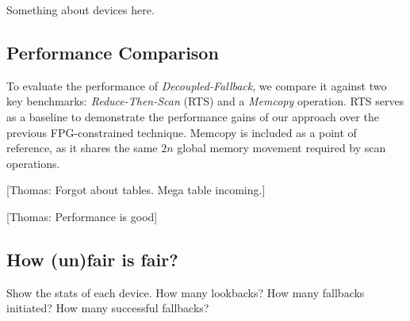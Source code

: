 \documentclass[sigconf]{acmart}
\newcommand{\thomas}[1]{{\footnotesize\color{orange}[Thomas: #1]}}
\begin{document}
Something about devices here.
\subsection{Performance Comparison}
To evaluate the performance of \emph{Decoupled-Fallback}, we compare it against two key benchmarks: \emph{Reduce-Then-Scan} (RTS) and a \emph{Memcopy} operation. RTS serves as a baseline to demonstrate the performance gains of our approach over the previous FPG-constrained technique. Memcopy is included as a point of reference, as it shares the same $2n$ global memory movement required by scan operations.

\thomas{Forgot about tables. Mega table incoming.}

\thomas{Performance is good}

\subsection{How (un)fair is fair?}
Show the stats of each device. How many lookbacks?  How many fallbacks initiated? How many successful fallbacks?
\end{document}
